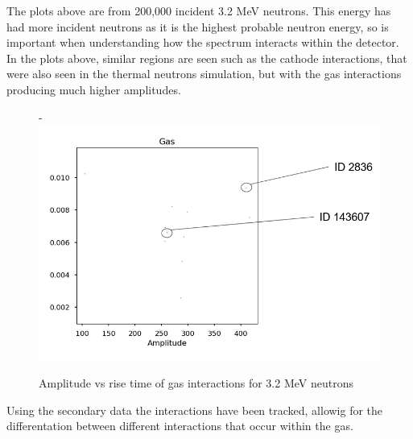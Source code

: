 \documentclass[a4paper]{article}
\begin{document}
\noindent The plots above are from 200,000 incident 3.2 MeV neutrons. This energy has had more incident neutrons as it is the highest probable neutron energy, so is important when understanding how the spectrum interacts within the detector. In the plots above, similar regions are seen such as the cathode interactions, that were also seen in the thermal neutrons simulation, but with the gas interactions producing much higher amplitudes. 
\begin{figure}[H]-
        \centering
        \includegraphics[width=1\linewidth]{Fast/gas-id-2.PNG}
        \caption{Amplitude vs rise time of gas interactions for 3.2 MeV neutrons}
        \label{fig:south2d}
        \end{figure}
\noindent Using the secondary data the interactions have been tracked, allowig for the differentation between different interactions that occur within the gas.
\end{document}
